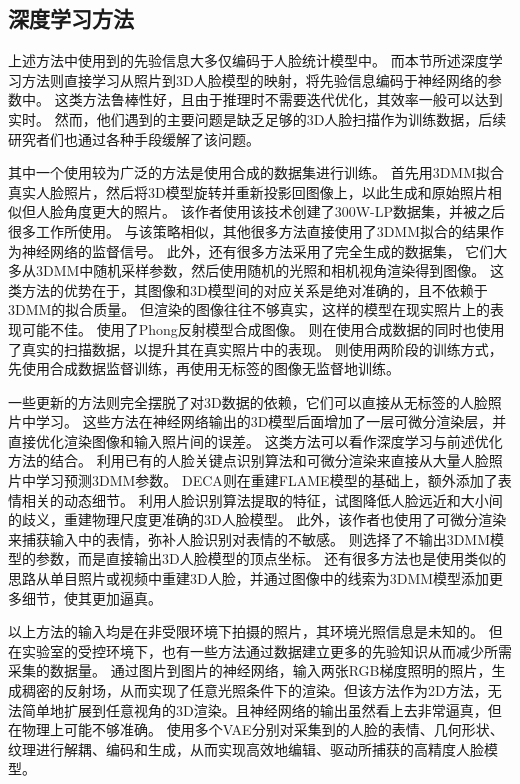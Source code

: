 \subsection{深度学习方法}

上述方法中使用到的先验信息大多仅编码于人脸统计模型中。
而本节所述深度学习方法则直接学习从照片到3D人脸模型的映射，将先验信息编码于神经网络的参数中。
这类方法鲁棒性好，且由于推理时不需要迭代优化，其效率一般可以达到实时。
然而，他们遇到的主要问题是缺乏足够的3D人脸扫描作为训练数据，后续研究者们也通过各种手段缓解了该问题。

其中一个使用较为广泛的方法是使用合成的数据集进行训练。
\citet{zhu2016face}首先用3DMM拟合真实人脸照片，然后将3D模型旋转并重新投影回图像上，以此生成和原始照片相似但人脸角度更大的照片。
该作者使用该技术创建了300W-LP数据集，并被之后很多工作所使用。
与该策略相似，其他很多方法\citep{trần2018extreme,chaudhuri2019joint}直接使用了3DMM拟合的结果作为神经网络的监督信号。
此外，还有很多方法采用了完全生成的数据集，
它们大多从3DMM中随机采样参数，然后使用随机的光照和相机视角渲染得到图像。
这类方法的优势在于，其图像和3D模型间的对应关系是绝对准确的，且不依赖于3DMM的拟合质量。
但渲染的图像往往不够真实，这样的模型在现实照片上的表现可能不佳。
\citet{richardson20163d}使用了Phong反射模型合成图像。
\citet{dou2017end}则在使用合成数据的同时也使用了真实的扫描数据，以提升其在真实照片中的表现。
\citet{genova2018unsupervised}则使用两阶段的训练方式，先使用合成数据监督训练，再使用无标签的图像无监督地训练。

一些更新的方法则完全摆脱了对3D数据的依赖，它们可以直接从无标签的人脸照片中学习。
这些方法在神经网络输出的3D模型后面增加了一层可微分渲染层，并直接优化渲染图像和输入照片间的误差。
这类方法可以看作深度学习与前述优化方法的结合。
\citet{deep3d}利用已有的人脸关键点识别算法和可微分渲染来直接从大量人脸照片中学习预测3DMM参数。
DECA\citep{DECA}则在重建FLAME模型的基础上，额外添加了表情相关的动态细节。
\citet{ZielonkaBT22}利用人脸识别算法提取的特征，试图降低人脸远近和大小间的歧义，重建物理尺度更准确的3D人脸模型。
此外，该作者也使用了可微分渲染来捕获输入中的表情，弥补人脸识别对表情的不敏感。
\citet{1022667848.nh,feng2018prn}则选择了不输出3DMM模型的参数，而是直接输出3D人脸模型的顶点坐标。
还有很多方法\citep{CaoBZB15,IchimBP15}也是使用类似的思路从单目照片或视频中重建3D人脸，并通过图像中的线索为3DMM模型添加更多细节，使其更加逼真。

以上方法的输入均是在非受限环境下拍摄的照片，其环境光照信息是未知的。
但在实验室的受控环境下，也有一些方法通过数据建立更多的先验知识从而减少所需采集的数据量。
\citet{MekaHPZFFKYBDDB19}通过图片到图片的神经网络，输入两张RGB梯度照明的照片，生成稠密的反射场，从而实现了任意光照条件下的渲染。但该方法作为2D方法，无法简单地扩展到任意视角的3D渲染。且神经网络的输出虽然看上去非常逼真，但在物理上可能不够准确。
\citet{ZhangZZLCYXY22}使用多个VAE分别对采集到的人脸的表情、几何形状、纹理进行解耦、编码和生成，从而实现高效地编辑、驱动所捕获的高精度人脸模型。

